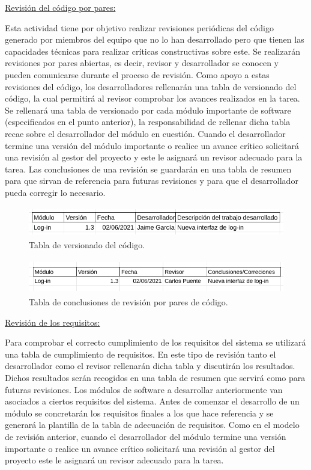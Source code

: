 \documentclass{article}
\begin{document}
\underline{Revisión del código por pares:}

Esta actividad tiene por objetivo realizar revisiones periódicas del código generado por miembros del equipo 
que no lo han desarrollado pero que tienen las capacidades técnicas para realizar críticas constructivas sobre este. 
Se realizarán revisiones por pares abiertas, es decir, revisor y desarrollador se conocen y pueden comunicarse durante 
el proceso de revisión.
Como apoyo a estas revisiones del código, los desarrolladores rellenarán una tabla de versionado del código, 
la cual permitirá al revisor comprobar los avances realizados en la tarea. Se rellenará una tabla de versionado por cada 
módulo importante de software (especificados en el punto anterior), la responsabilidad de rellenar dicha tabla recae sobre 
el desarrollador del módulo en cuestión.
Cuando el desarrollador termine una versión del módulo importante o realice un avance crítico solicitará una revisión 
al gestor del proyecto y este le asignará un revisor adecuado para la tarea. Las conclusiones de una revisión se guardarán 
en una tabla de resumen para que sirvan de referencia para futuras revisiones y para que el desarrollador pueda corregir lo necesario.

\begin{figure}[H]
    \centering
        \includegraphics[height=1.3cm]{../images/tabla_versionado_code.png}
    \caption{Tabla de versionado del código.}
    \label{tablaVersionado}
\end{figure}

\begin{figure}[H]
    \centering
        \includegraphics[height=1.5cm]{../images/tabla_conclusiones_revision_pares.png}
    \caption{Tabla de conclusiones de revisión por pares de código.}
    \label{tablaConclusionesPares}
\end{figure}

\underline{Revisión de los requisitos:}

Para comprobar el correcto cumplimiento de los requisitos del sistema se utilizará una tabla de cumplimiento de requisitos. 
En este tipo de revisión tanto el desarrollador como el revisor rellenarán dicha tabla y discutirán los resultados. 
Dichos resultados serán recogidos en una tabla de resumen que servirá como para futuras revisiones.
Los módulos de software a desarrollar anteriormente van asociados a ciertos requisitos del sistema. 
Antes de comenzar el desarrollo de un módulo se concretarán los requisitos finales a los que hace referencia 
y se generará la plantilla de la tabla de adecuación de requisitos.
Como en el modelo de revisión anterior, cuando el desarrollador del módulo termine una versión importante o 
realice un avance crítico solicitará una revisión al gestor del proyecto este le asignará un revisor adecuado para la tarea. 
\end{document}
